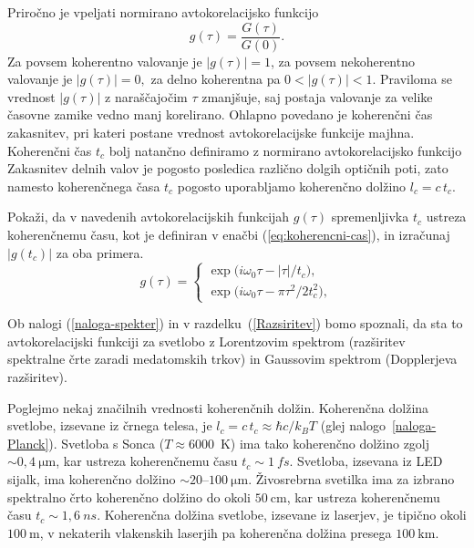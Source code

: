 Priročno je vpeljati normirano avtokorelacijsko funkcijo 
\begin{equation}
g(\tau)=\frac{G(\tau)}{G(0)}.
\label{eq:avtokorelacija-norm}
\end{equation}
Za povsem koherentno valovanje je $|g(\tau)|=1$, za povsem nekoherentno
valovanje je $|g(\tau)|=0,$ za delno koherentna  pa $0<|g(\tau)|<1$.
Praviloma se vrednost $|g(\tau)|$ z naraščajočim $\tau$ zmanjšuje,
saj postaja valovanje za velike časovne zamike vedno manj korelirano.
Ohlapno povedano je koherenčni čas zakasnitev, pri kateri postane
vrednost avtokorelacijske funkcije majhna.
Koherenčni čas $t_{c}$ bolj natančno definiramo 
z normirano avtokorelacijsko funkcijo
Zakasnitev delnih valov je pogosto posledica
različno dolgih optičnih poti, zato namesto koherenčnega časa $t_c$
pogosto uporabljamo koherenčno dolžino $l_{c}=c\,t_{c}$. 

\begin{definition}
Pokaži, da v navedenih avtokorelacijskih
funkcijah $g(\tau)$ spremenljivka $t_{c}$ ustreza koherenčnemu času,
kot je definiran v enačbi (\ref{eq:koherencni-cas}), in izračunaj $|g(t_{c})|$ za oba primera.
\begin{equation}
g(\tau)=\begin{cases}
\exp\big(i\omega_{0}\tau-\left|\tau\right|/t_{c}\big),\\
\exp\big(i\omega_{0}\tau-\pi\tau^{2}/2t_{c}^{2}\big),
\end{cases}
\label{eq:gauss-eksponent}
\end{equation}

Ob nalogi (\ref{naloga-spekter}) in v razdelku~(\ref{Razsiritev}) 
bomo spoznali, da sta to avtokorelacijski
funkciji za svetlobo z Lorentzovim spektrom
(razširitev spektralne črte zaradi medatomskih trkov) in Gaussovim spektrom
(Dopplerjeva razširitev).
\end{definition}

Poglejmo nekaj značilnih vrednosti koherenčnih dolžin. 
Koherenčna dolžina svetlobe, izsevane iz črnega telesa, je $l_{c}=c\,t_{c}\approx 
\hbar c/k_{B}T$ (glej nalogo~\ref{naloga-Planck}). 
Svetloba s Sonca ($T \approx 6000$~K)
ima tako koherenčno dolžino zgolj $\sim 0,4~\si{\micro\metre}$, kar ustreza
koherenčnemu času $t_c \sim 1~\si{fs}$. Svetloba,
izsevana iz LED sijalk, ima koherenčno dolžino $\sim20$--$100~\si{\micro\metre}$.
Živosrebrna svetilka ima za izbrano spektralno črto koherenčno dolžino
do okoli $50~\si{\centi\metre}$, kar ustreza koherenčnemu času $t_c \sim 1,6~\si{ns}$.
Koherenčna dolžina svetlobe, izsevane iz laserjev, je tipično okoli $100~\si{\metre}$, 
v nekaterih vlakenskih laserjih pa koherenčna dolžina 
presega $100~\si{\kilo\metre}$.

